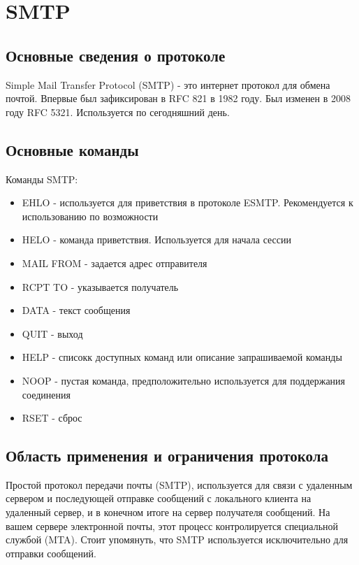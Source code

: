 





\section{SMTP}

\subsection{Основные сведения о протоколе}
Simple Mail Transfer Protocol (SMTP)  - это интернет протокол для обмена почтой. Впервые был зафиксирован в RFC 821 в 1982 году. Был изменен в 2008 году RFC 5321. Используется по сегодняшний день.

\subsection{Основные команды}
Команды SMTP:
\begin{itemize}
\item EHLO - используется для приветствия в протоколе ESMTP. Рекомендуется к использованию по возможности
\item HELO - команда приветствия. Используется для начала сессии
\item MAIL FROM - задается адрес отправителя
\item RCPT TO - указывается получатель
\item DATA - текст сообщения
\item QUIT - выход
\item HELP - списокк доступных команд или описание запрашиваемой команды
\item NOOP - пустая команда, предположительно используется для поддержания соединения
\item RSET - сброс
\end{itemize}

\subsection{Область применения и ограничения протокола}
Простой протокол передачи почты (SMTP), используется для связи с удаленным сервером и последующей отправке сообщений с локального клиента на удаленный сервер, и в конечном итоге на сервер получателя сообщений. На вашем сервере электронной почты, этот процесс контролируется специальной службой (MTA). Стоит упомянуть, что SMTP используется исключительно для отправки сообщений.

